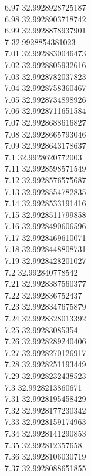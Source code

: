 {6.97	32.9928928725187\\
6.98	32.9928903718742\\
6.99	32.9928878937901\\
7	32.9928854381023\\
7.01	32.9928830046473\\
7.02	32.9928805932616\\
7.03	32.9928782037823\\
7.04	32.9928758360467\\
7.05	32.9928734898926\\
7.06	32.9928711651584\\
7.07	32.9928688616827\\
7.08	32.9928665793046\\
7.09	32.9928643178637\\
7.1	32.9928620772003\\
7.11	32.9928598571549\\
7.12	32.9928576575687\\
7.13	32.9928554782835\\
7.14	32.9928533191416\\
7.15	32.9928511799858\\
7.16	32.9928490606596\\
7.17	32.9928469610071\\
7.18	32.9928448808731\\
7.19	32.9928428201027\\
7.2	32.992840778542\\
7.21	32.9928387560377\\
7.22	32.992836752437\\
7.23	32.9928347675879\\
7.24	32.9928328013392\\
7.25	32.99283085354\\
7.26	32.9928289240406\\
7.27	32.9928270126917\\
7.28	32.9928251193449\\
7.29	32.9928232438523\\
7.3	32.9928213860671\\
7.31	32.9928195458429\\
7.32	32.9928177230342\\
7.33	32.9928159174963\\
7.34	32.9928141290853\\
7.35	32.992812357658\\
7.36	32.9928106030719\\
7.37	32.9928088651855\\
}
